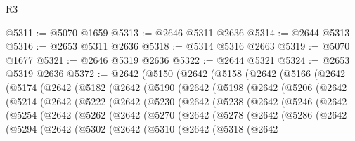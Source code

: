 \begin{lexlean}{R3}
\begin{coremodule}
@5311 := @5070 @1659
@5313 := @2646 @5311 @2636
@5314 := @2644 @5313
@5316 := @2653 @5311 @2636
@5318 := @5314 @5316 @2663
@5319 := @5070 @1677
@5321 := @2646 @5319 @2636
@5322 := @2644 @5321
@5324 := @2653 @5319 @2636
@5372 := @2642
    (@5150
      (@2642
        (@5158
          (@2642
            (@5166
              (@2642
                (@5174
                  (@2642
                    (@5182
                      (@2642
                        (@5190
                          (@2642
                            (@5198
                              (@2642
                                (@5206
                                  (@2642
                                    (@5214
                                      (@2642
                                        (@5222
                                          (@2642
                                            (@5230
                                              (@2642
                                                (@5238
                                                  (@2642
                                                    (@5246
                                                      (@2642
                                                        (@5254
                                                          (@2642
                                                            (@5262
                                                              (@2642
                                                                (@5270
                                                                  (@2642
                                                                    (@5278
                                                                      (@2642
                                                                        (@5286
                                                                          (@2642
                                                                            (@5294
                                                                              (@2642
                                                                                (@5302
                                                                                  (@2642
                                                                                    (@5310
                                                                                      (@2642
                                                                                        (@5318
                                                                                          (@2642

\end{coremodule}
\end{lexlean}
